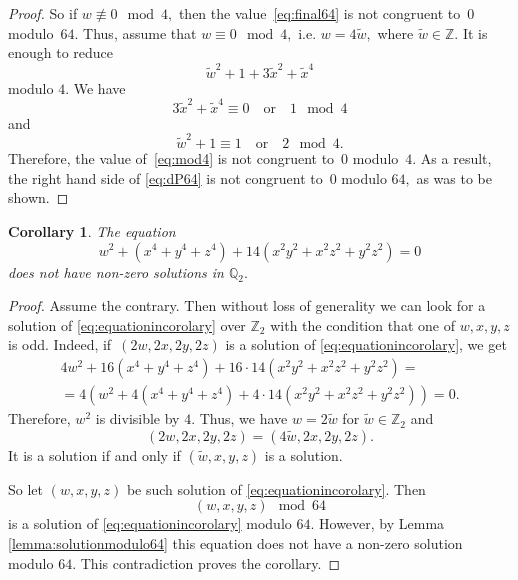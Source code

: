 \documentclass{amsart}
\numberwithin{equation}{section}
\newtheorem{Cor}[subsection]{Corollary}
\theoremstyle{definition}
\begin{document}
\begin{proof}
\noindent So if $w \not\equiv 0 \mod 4,$ then the value~\eqref{eq:final64} is not congruent to~$0$ modulo~$64.$ Thus, assume that $w \equiv 0 \mod 4,$ i.e. $w=4\tilde{w},$ where $\tilde{w} \in \mathbb{Z}.$ It is enough to reduce
\begin{equation}\label{eq:mod4}
\tilde{w}^2+1+3\tilde{x}^2+\tilde{x}^4  %
\end{equation}
\noindent modulo $4.$ We have 
$$
3\tilde{x}^2+\tilde{x}^4 \equiv 0 \quad \text{or} \quad 1 \mod 4
$$
\noindent and
$$
\tilde{w}^2+1 \equiv  1 \quad \text{or} \quad 2 \mod 4.
$$
\noindent Therefore, the value of~\eqref{eq:mod4} is not congruent to~$0$ modulo~$4.$ As a result, the right hand side of \eqref{eq:dP64} is not congruent to~$0$ modulo $64,$ as was to be shown.




\end{proof}

\begin{Cor}\label{cor}
The equation 
\begin{equation}\label{eq:equationincorolary}
w^2+(x^4+y^4+z^4)+14(x^2y^2+x^2z^2+y^2z^2)=0
\end{equation}
\noindent does not have  non-zero solutions in $\mathbb{Q}_2.$
\end{Cor}

\begin{proof}
Assume the contrary. Then without loss of generality we can look for a solution of \eqref{eq:equationincorolary} over $\mathbb{Z}_2$ with the condition that one of $w,x,y,z$ is odd.   Indeed, if~$(2w,2x,2y,2z)$ is a solution of \eqref{eq:equationincorolary}, we get
\begin{gather*}
4w^2+16(x^4+y^4+z^4)+16\cdot14(x^2y^2+x^2z^2+y^2z^2)=\\
=4(w^2+4(x^4+y^4+z^4)+4\cdot14(x^2y^2+x^2z^2+y^2z^2))=0.
\end{gather*}
\noindent Therefore, $w^2$ is divisible by $4.$ Thus, we have $w=2\tilde{w}$ for $\tilde{w} \in \mathbb{Z}_2$ and 
$$
(2w,2x,2y,2z)=(4\tilde{w},2x,2y,2z).
$$
\noindent It is a solution if and only if $(\tilde{w},x,y,z)$ is a solution.

So let $(w,x,y,z)$ be such solution of \eqref{eq:equationincorolary}. Then 
$$
(w,x,y,z) \mod 64
$$
\noindent is a solution of \eqref{eq:equationincorolary} modulo $64.$ However, by Lemma \ref{lemma:solutionmodulo64} this equation does not have a non-zero solution modulo $64.$ This contradiction proves the corollary.

\end{proof}
\end{document}
